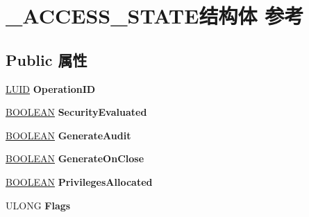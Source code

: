 \hypertarget{struct___a_c_c_e_s_s___s_t_a_t_e}{}\section{\+\_\+\+A\+C\+C\+E\+S\+S\+\_\+\+S\+T\+A\+T\+E结构体 参考}
\label{struct___a_c_c_e_s_s___s_t_a_t_e}
\subsection*{Public 属性}
\begin{DoxyCompactItemize}
\item 
\mbox{\label{struct___a_c_c_e_s_s___s_t_a_t_e_ae221bb4ee81e5335ac4df362d7b66717}} 
\hyperlink{struct___l_u_i_d}{L\+U\+ID} {\bfseries Operation\+ID}
\item 
\mbox{\label{struct___a_c_c_e_s_s___s_t_a_t_e_aaf29091165b93a8e84d58ce652c40714}} 
\hyperlink{_processor_bind_8h_a112e3146cb38b6ee95e64d85842e380a}{B\+O\+O\+L\+E\+AN} {\bfseries Security\+Evaluated}
\item 
\mbox{\label{struct___a_c_c_e_s_s___s_t_a_t_e_adf96f66d1179a6b1e5aaf638c5f477be}} 
\hyperlink{_processor_bind_8h_a112e3146cb38b6ee95e64d85842e380a}{B\+O\+O\+L\+E\+AN} {\bfseries Generate\+Audit}
\item 
\mbox{\label{struct___a_c_c_e_s_s___s_t_a_t_e_ad31aab57c62b344a33b073e5433d425d}} 
\hyperlink{_processor_bind_8h_a112e3146cb38b6ee95e64d85842e380a}{B\+O\+O\+L\+E\+AN} {\bfseries Generate\+On\+Close}
\item 
\mbox{\label{struct___a_c_c_e_s_s___s_t_a_t_e_af14834158b4a3cf4c6fed25c34183ca5}} 
\hyperlink{_processor_bind_8h_a112e3146cb38b6ee95e64d85842e380a}{B\+O\+O\+L\+E\+AN} {\bfseries Privileges\+Allocated}
\item 
\mbox{\label{struct___a_c_c_e_s_s___s_t_a_t_e_a4801060e23c4cefa88fbf3e26b98a54f}} 
U\+L\+O\+NG {\bfseries Flags}
\item 
\mbox{\label{struct___a_c_c_e_s_s___s_t_a_t_e_a8dae0d10dc7ebf84367bdad779328e1e}} 

\end{DoxyCompactItemize}
